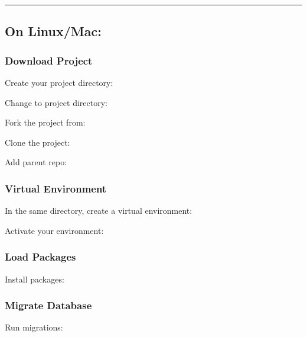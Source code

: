 \documentclass[letterpaper,10pt,english]{sphinxmanual}
\begin{document}
\bigskip\hrule\bigskip



\subsection{On Linux/Mac:}
\label{\detokenize{guide/01_quickstart:on-linux-mac}}

\subsubsection{Download Project}
\label{\detokenize{guide/01_quickstart:download-project}}
Create your project directory: 

Change to project directory: 

Fork the project from: 

Clone the project: 

Add parent repo: 


\subsubsection{Virtual Environment}
\label{\detokenize{guide/01_quickstart:virtual-environment}}
In the same directory, create a virtual environment: 

Activate your environment: 


\subsubsection{Load Packages}
\label{\detokenize{guide/01_quickstart:load-packages}}
Install packages: 


\subsubsection{Migrate Database}
\label{\detokenize{guide/01_quickstart:migrate-database}}
Run migrations: 
\end{document}
